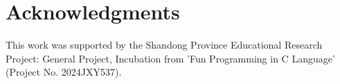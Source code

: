 \documentclass[a4paper,fleqn]{cas-dc}
\begin{document}
\section{Acknowledgments}  
This work was supported by the Shandong Province Educational Research Project: General Project, Incubation from 'Fun Programming in C Language' (Project No. 2024JXY537). 

\clearpage
%
 	
% 
%  				


\vskip6pt
\end{document}
